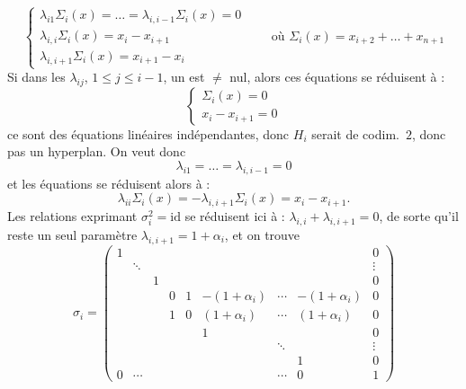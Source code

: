 \documentclass[11pt,a4paper]{article}
\begin{document}
\[
\begin{cases}
\lambda_{i1}\Sigma_i(x) = \dots = \lambda_{i,i-1}\Sigma_i(x) = 0 \\
\lambda_{i,i}\Sigma_i(x) = x_i-x_{i+1} \\
\lambda_{i,i+1}\Sigma_i(x) = x_{i+1}-x_i
\end{cases}
\qquad \text{où } \Sigma_i(x) = x_{i+2}+\dots+x_{n+1}
\]
Si dans les $\lambda_{ij}$, $1\leq j\leq i-1$, un est $\neq$ nul, alors ces équations se réduisent à :
\[
\begin{cases}
\Sigma_i(x) = 0 \\
x_i-x_{i+1} = 0
\end{cases}
\]
ce sont des équations linéaires indépendantes, donc $H_i$ serait de codim.~$2$, donc pas un hyperplan. On veut donc
\[
\lambda_{i1} = \dots = \lambda_{i,i-1} = 0
\]
et les équations se réduisent alors à :
\[
\lambda_{ii}\Sigma_i(x) = -\lambda_{i,i+1}\Sigma_i(x) = x_i-x_{i+1} .
\]
Les relations exprimant $\sigma_i^2=\mathrm{id}$ se réduisent ici à : $\lambda_{i,i}+\lambda_{i,i+1}=0$, de sorte qu'il reste un seul paramètre $\lambda_{i,i+1}=1+\alpha_i$, et on trouve
\[
\sigma_i =
\begin{pmatrix}
1 & & & & & & & & 0 \\
 & \ddots & & & & & & & \vdots \\
 & & 1 & & & & & & 0 \\
 & & & 0 & 1 & -(1+\alpha_i) & \cdots & -(1+\alpha_i) & 0 \\
 & & & 1 & 0 & (1+\alpha_i) & \cdots & (1+\alpha_i) & 0 \\
 & & & & & 1 & & & 0 \\
 & & & & & & \ddots & & \vdots \\
 & & & & & & & 1 & 0 \\
0 & \cdots & & & & & \cdots & 0 & 1
\end{pmatrix}
\]
\end{document}
